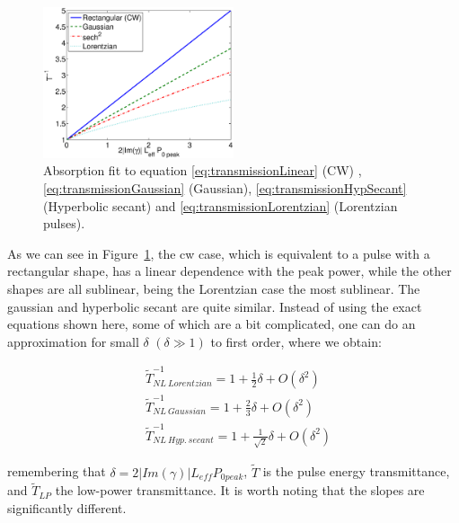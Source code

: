 \documentclass[10pt,letterpaper]{article}
\begin{document}


\begin{figure}[htb]
    \centering
    \includegraphics[width=0.5\textwidth]{imGamma_transmissionGaussianLorentzianHypSecant}
    \caption{Absorption fit to equation \ref{eq:transmissionLinear} (CW) , \ref{eq:transmissionGaussian} (Gaussian), \ref{eq:transmissionHypSecant} (Hyperbolic secant) and \ref{eq:transmissionLorentzian} (Lorentzian pulses).}
    \label{fig:transmissionGaussianLorentzianHypSecant}
\end{figure}


As we can see in Figure~\ref{fig:transmissionGaussianLorentzianHypSecant}, the cw case, which is equivalent to a pulse with a rectangular shape, has a linear dependence with the peak power, while the other shapes are all sublinear, being the Lorentzian case the most sublinear. The gaussian and hyperbolic secant are quite similar.
Instead of using the exact equations shown here, some of which are a bit complicated, one can do an approximation for small $ \delta $ $(\delta \gg 1)$ to first order, where we obtain:


\begin{align}
&  \tilde{T}^{-1}_{NL~Lorentzian}   = 1 + \frac{1}{2}\delta + O(\delta^2) \\
& \tilde{T}^{-1}_{NL~Gaussian}  = 1 + \frac{2}{3}\delta + O(\delta^2) \\
& \tilde{T}^{-1}_{NL~Hyp.~secant}  = 1 + \frac{1}{\sqrt{2}}\delta + O(\delta^2)
\end{align}


remembering that $ \delta = 2|Im(\gamma)| L_{eff} P_{0 peak} $, $ \tilde{T} $ is the pulse energy transmittance, and $ \tilde{T}_{LP} $ the low-power transmittance. It is worth noting that the slopes are significantly different.
\end{document}
